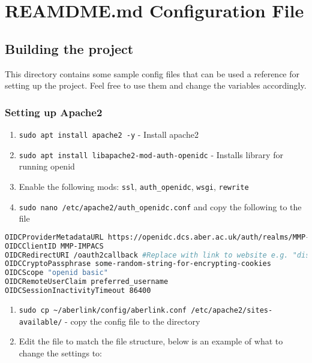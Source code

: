 \chapter{REAMDME.md Configuration File}

\section{Building the project}\label{building-the-project}

This directory contains some sample config files that can be used a
reference for setting up the project. Feel free to use them and change
the variables accordingly.

\subsection{Setting up Apache2}\label{setting-up-apache2}

\begin{enumerate}
\def\labelenumi{\arabic{enumi}.}
\item
  \texttt{sudo apt install apache2 -y} - Install apache2
\item
  \texttt{sudo apt install libapache2-mod-auth-openidc} - Installs
  library for running openid
\item
  Enable the following mods: \texttt{ssl}, \texttt{auth\_openidc},
  \texttt{wsgi}, \texttt{rewrite}
\item
  \texttt{sudo nano /etc/apache2/auth\_openidc.conf} and copy the
  following to the file
\end{enumerate}

\begin{lstlisting}[language=bash]
OIDCProviderMetadataURL https://openidc.dcs.aber.ac.uk/auth/realms/MMP-IMPACS/.well-known/openid-configuration
OIDCClientID MMP-IMPACS 
OIDCRedirectURI /oauth2callback #Replace with link to website e.g. "discord.dcs.aber.ac.uk/oauth2callback"
OIDCCryptoPassphrase some-random-string-for-encrypting-cookies
OIDCScope "openid basic"
OIDCRemoteUserClaim preferred_username
OIDCSessionInactivityTimeout 86400
\end{lstlisting}

\begin{enumerate}
\def\labelenumi{\arabic{enumi}.}
\setcounter{enumi}{4}
\item
  \texttt{sudo cp \textasciitilde{}/aberlink/config/aberlink.conf /etc/apache2/sites-available/}
  - copy the config file to the directory
\item
  Edit the file to match the file structure, below is an example of what
  to change the settings to:
\end{enumerate}

